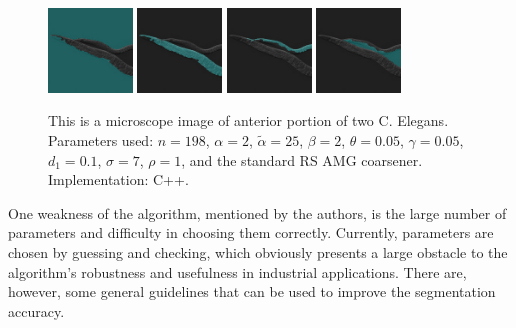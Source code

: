 \documentclass[12pt]{article}%
\begin{document}
\begin{figure}[ht]
   \centering
   \includegraphics[width=0.2\textwidth]{two_c_elegans_seg_blend_0000.png} \hspace{0.45cm}
   \includegraphics[width=0.2\textwidth]{two_c_elegans_seg_blend_0001.png} \hspace{0.45cm}
   \includegraphics[width=0.2\textwidth]{two_c_elegans_seg_blend_0002.png} \hspace{0.45cm}
   \includegraphics[width=0.2\textwidth]{two_c_elegans_seg_blend_0003.png}
   \caption{This is a microscope image of anterior portion of two C. Elegans.  Parameters used: $n = 198$, $\alpha = 2$, $\tilde{\alpha} = 25$, $\beta = 2$, $\theta = 0.05$, $\gamma = 0.05$, $d_1 = 0.1$, $\sigma = 7$, $\rho = 1$, and the standard RS AMG coarsener.  Implementation: C++.}
   \label{fig:c_elegans}
\end{figure}


One weakness of the algorithm, mentioned by the authors, is the large number of parameters and difficulty in choosing them correctly. Currently, parameters are chosen by guessing and checking, which obviously presents a large obstacle to the algorithm's robustness and usefulness in industrial applications. There are, however, some general guidelines that can be used to improve the segmentation accuracy.\\
\end{document}

